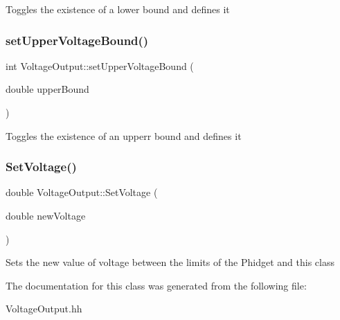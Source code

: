 Toggles the existence of a lower bound and defines it\mbox{\label{classVoltageOutput_a252ec58d9c49ee7de880efd23f7feedc}} 
\subsubsection{\texorpdfstring{set\+Upper\+Voltage\+Bound()}{setUpperVoltageBound()}}
{\footnotesize\ttfamily int Voltage\+Output\+::set\+Upper\+Voltage\+Bound (\begin{DoxyParamCaption}\item[{double}]{upper\+Bound }\end{DoxyParamCaption})\hspace{0.3cm}{\ttfamily [inline]}}

Toggles the existence of an upperr bound and defines it\mbox{\label{classVoltageOutput_a1e8a1a0f8ce9c8ecec3b14f6664f3b1b}} 
\subsubsection{\texorpdfstring{Set\+Voltage()}{SetVoltage()}}
{\footnotesize\ttfamily double Voltage\+Output\+::\+Set\+Voltage (\begin{DoxyParamCaption}\item[{double}]{new\+Voltage }\end{DoxyParamCaption})\hspace{0.3cm}{\ttfamily [inline]}}

Sets the new value of voltage between the limits of the Phidget and this class

The documentation for this class was generated from the following file\+:\begin{DoxyCompactItemize}
\item 
Voltage\+Output.\+hh\end{DoxyCompactItemize}
